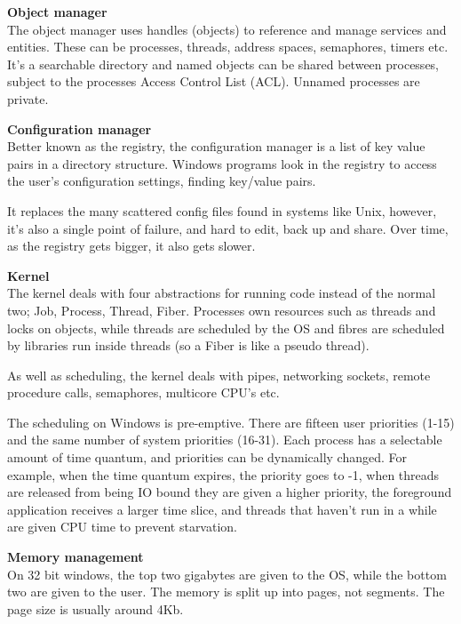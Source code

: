 \begin{description}
  \item \textbf{Object manager}\\
    The object manager uses handles (objects) to reference and manage services
    and entities. These can be processes, threads, address spaces, semaphores,
    timers etc. It's a searchable directory and named objects can be shared
    between processes, subject to the processes Access Control List (ACL).
    Unnamed processes are private.

  \item \textbf{Configuration manager}\\
    Better known as the registry, the configuration manager is a list of key
    value pairs in a  directory structure. Windows programs look in the registry
    to access the user's configuration settings, finding key/value pairs.

    It replaces the many scattered config files found in systems like Unix,
    however, it's also a single point of failure, and hard to edit, back up and
    share. Over time, as the registry gets bigger, it also gets slower.

  \item \textbf{Kernel}\\
    The kernel deals with four abstractions for running code instead of the
    normal two; Job, Process, Thread, Fiber. Processes own resources such as
    threads and locks on objects, while threads are scheduled by the OS and
    fibres are scheduled by libraries run inside threads (so a Fiber is like a
    pseudo thread).

    As well as scheduling, the kernel deals with pipes, networking sockets,
    remote procedure calls, semaphores, multicore CPU's etc.

    The scheduling on Windows is pre-emptive. There are fifteen user priorities
    (1-15) and the same number of system priorities (16-31). Each process has a
    selectable amount of time quantum, and priorities can be dynamically
    changed. For example, when the time quantum expires, the priority goes to
    -1, when threads are released from being IO bound they are given a higher
    priority, the foreground application receives a larger time slice, and
    threads that haven't run in a while are given CPU time to prevent
    starvation.

  \item \textbf{Memory management}\\
    On 32 bit windows, the top two gigabytes are given to the OS, while the
    bottom two are given to the user. The memory is split up into pages, not
    segments. The page size is usually around 4Kb.


\end{description}

